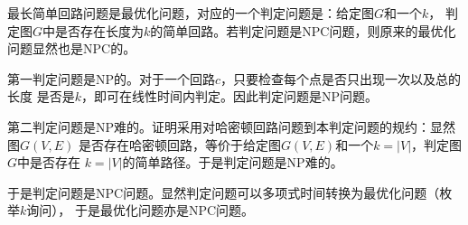 \begin{solution}
    最长简单回路问题是最优化问题，对应的一个判定问题是：给定图$G$和一个$k$，
    判定图$G$中是否存在长度为$k$的简单回路。若判定问题是NPC问题，则原来的最优化
    问题显然也是NPC的。

    第一判定问题是NP的。对于一个回路$c$，只要检查每个点是否只出现一次以及总的长度
    是否是$k$，即可在线性时间内判定。因此判定问题是NP问题。

    第二判定问题是NP难的。证明采用对哈密顿回路问题到本判定问题的规约：显然图$G(V,E)$
    是否存在哈密顿回路，等价于给定图$G(V,E)$和一个$k=|V|$，判定图$G$中是否存在
    $k=|V|$的简单路径。于是判定问题是NP难的。

    于是判定问题是NPC问题。显然判定问题可以多项式时间转换为最优化问题（枚举$k$询问），
    于是最优化问题亦是NPC问题。
\end{solution}